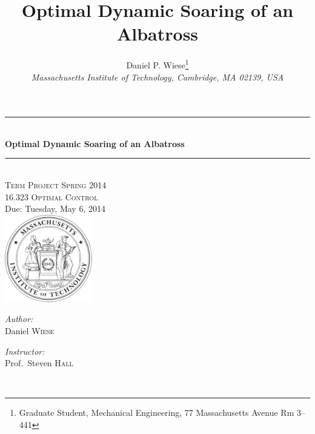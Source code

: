 \documentclass[11pt,letterpaper,onecolumn]{article}
\title{Optimal Dynamic Soaring of an Albatross}
\author{
Daniel P. Wiese\thanks{Graduate Student, Mechanical Engineering, 77 Massachusetts Avenue Rm 3--441} \\
{\normalsize\itshape{}Massachusetts Institute of Technology, Cambridge, MA 02139, USA} \\[4pt]
}
\begin{document}
\begin{titlepage}
  \begin{center}
    \rule{\linewidth}{0.01in} \\[0.25in]
    { \huge \bfseries Optimal Dynamic Soaring of an Albatross }\\[0.4cm]
    \rule{\linewidth}{0.01in} \\[0.25in]

    \textsc{\LARGE Term Project Spring 2014 }\\[0.05in]
    \textsc{\Large 16.323 Optimal Control}\\[0.25in]
    \large Due: Tuesday, May 6, 2014 \\[1.1in]
    \includegraphics[width=1.5in]{../fig/mit-seal.pdf}\\[2.9in]
    \begin{minipage}{0.4\textwidth}
      \begin{flushleft} \large
        \emph{Author:}\\
        Daniel \textsc{Wiese}
        \vfill
      \end{flushleft}
    \end{minipage}
    \begin{minipage}{0.4\textwidth}
      \begin{flushright} \large
        \emph{Instructor:} \\
        Prof.~Steven \textsc{Hall} \\
      \end{flushright}
    \end{minipage} \\
    \vfill
  \end{center}
\end{titlepage}

\clearpage
\end{document}
